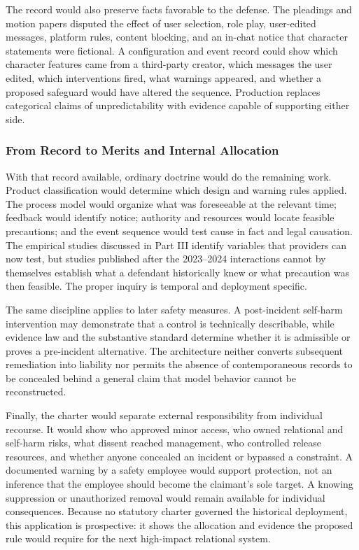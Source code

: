 The record would also preserve facts favorable to the defense. The pleadings and motion papers disputed the effect of user selection, role play, user-edited messages, platform rules, content blocking, and an in-chat notice that character statements were fictional. A configuration and event record could show which character features came from a third-party creator, which messages the user edited, which interventions fired, what warnings appeared, and whether a proposed safeguard would have altered the sequence. Production replaces categorical claims of unpredictability with evidence capable of supporting either side.

\subsubsection{From Record to Merits and Internal Allocation}

With that record available, ordinary doctrine would do the remaining work. Product classification would determine which design and warning rules applied. The process model would organize what was foreseeable at the relevant time; feedback would identify notice; authority and resources would locate feasible precautions; and the event sequence would test cause in fact and legal causation. The empirical studies discussed in Part III identify variables that providers can now test, but studies published after the 2023--2024 interactions cannot by themselves establish what a defendant historically knew or what precaution was then feasible. The proper inquiry is temporal and deployment specific.

The same discipline applies to later safety measures. A post-incident self-harm intervention may demonstrate that a control is technically describable, while evidence law and the substantive standard determine whether it is admissible or proves a pre-incident alternative. The architecture neither converts subsequent remediation into liability nor permits the absence of contemporaneous records to be concealed behind a general claim that model behavior cannot be reconstructed.

Finally, the charter would separate external responsibility from individual recourse. It would show who approved minor access, who owned relational and self-harm risks, what dissent reached management, who controlled release resources, and whether anyone concealed an incident or bypassed a constraint. A documented warning by a safety employee would support protection, not an inference that the employee should become the claimant's sole target. A knowing suppression or unauthorized removal would remain available for individual consequences. Because no statutory charter governed the historical deployment, this application is prospective: it shows the allocation and evidence the proposed rule would require for the next high-impact relational system.

